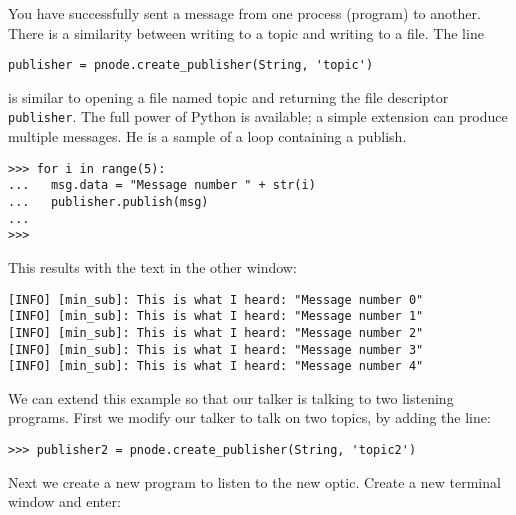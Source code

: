 You have successfully sent a message from one process (program) to
another. There is a similarity between writing to a topic and writing to
a file. The line

\begin{verbatim}
publisher = pnode.create_publisher(String, 'topic')
\end{verbatim}

is similar to opening a file named topic and returning the file
descriptor \texttt{publisher}. The full power of Python is available; a
simple extension can produce multiple messages. He is a sample of a loop
containing a publish.

\begin{verbatim}
>>> for i in range(5):
...   msg.data = "Message number " + str(i)
...   publisher.publish(msg)
...
>>>
\end{verbatim}

This results with the text in the other window:

\begin{verbatim}
[INFO] [min_sub]: This is what I heard: "Message number 0"
[INFO] [min_sub]: This is what I heard: "Message number 1"
[INFO] [min_sub]: This is what I heard: "Message number 2"
[INFO] [min_sub]: This is what I heard: "Message number 3"
[INFO] [min_sub]: This is what I heard: "Message number 4"
\end{verbatim}

We can extend this example so that our talker is talking to two
listening programs. First we modify our talker to {talk} on two topics,
by adding the line:

\begin{verbatim}
>>> publisher2 = pnode.create_publisher(String, 'topic2')
\end{verbatim}

Next we create a new program to listen to the new optic. Create a new
terminal window and enter:

